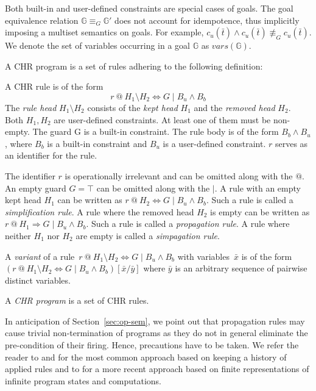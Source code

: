 \documentclass[acmtocl]{acmtrans2m}
\newcommand{\G}{\ensuremath{\mathbb{G}}}
\newcommand{\cu}{\ensuremath{c_u(\bar t)}}
\newcommand{\by}{\bar{y}}
\begin{document}
Both built-in and user-defined constraints are special cases of goals. The goal
equivalence relation $\G\equiv_{G}\G'$ does not account for idempotence, thus
implicitly imposing a multiset semantics on goals. For example,
$\cu\wedge\cu\not\equiv_{G}\cu$. We denote the set of variables occurring in a
goal $\G$ as $vars(\G)$.

A CHR program is a set of rules adhering to the following definition:

\begin{definition} \label{def:chr_rule}
\begin{longenum}
\item A CHR rule is of
the form
\[
r\ @\ H_1\setminus H_2 \Leftrightarrow G \mid B_u\wedge B_b
\]
The \emph{rule head} $H_1\setminus H_2$ consists of the \emph{kept head} $H_1$
and the \emph{removed head} $H_2$. Both $H_1,H_2$ are user-defined constraints.
At least one of them must be non-empty. The guard G is a built-in constraint.
The rule body is of the form $B_b\wedge B_u$, where $B_b$ is a built-in
constraint and $B_u$ is a user-defined constraint. $r$ serves as an identifier
for the rule.

\item The identifier $r$ is operationally irrelevant and can be omitted along
with the $@$. An empty guard $G=\top$ can be omitted along with the $\mid$. A
rule with an empty kept head $H_1$ can be written as $r\ @\ H_2 \Leftrightarrow
G \mid B_u\wedge B_b$. Such a rule is called a \emph{simplification rule}. A
rule where the removed head $H_2$ is empty can be written as $r\ @\ H_1
\Rightarrow G \mid B_u\wedge B_b$. Such a rule is called a \emph{propagation
rule}. A rule where neither $H_1$ nor $H_2$ are empty is called a
\emph{simpagation rule}.

\item A \emph{variant} of a rule~$r\ @\ H_1 \setminus H_2 \Leftrightarrow G \mid
B_u\wedge B_b$ with variables~$\bar x$ is of the form $(r\ @\ H_1 \setminus H_2
\Leftrightarrow G \mid B_u\wedge B_b)[\bar x / \bar y]$ where $\by$ is an
arbitrary sequence of pairwise distinct variables.

\item A \emph{CHR program} is a set of CHR rules.
\end{longenum}
\end{definition}

In anticipation of Section~\ref{sec:op-sem}, we point out that propagation rules
may cause trivial non-termination of programs as they do not in general
eliminate the pre-condition of their firing. Hence, precautions have to be
taken. We refer the reader to  and
 for the most common approach based on keeping a
history of applied rules and to  for a
more recent approach based on finite representations of infinite program states and computations.
\end{document}
